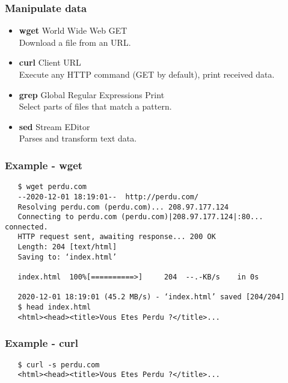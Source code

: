 \begin{frame}
   \frametitle{Manipulate data}
   \begin{itemize}
      \item {\bf wget} World Wide Web GET \\
            Download a file from an URL.
      \item {\bf curl} Client URL \\
            Execute any HTTP command (GET by default), print received data.
      \item {\bf grep} Global Regular Expressions Print \\
            Select parts of files that match a pattern.
      \item {\bf sed} Stream EDitor \\
            Parses and transform text data.
   \end{itemize}
\end{frame}

\begin{frame}[fragile]
   \frametitle{Example - wget}
   \begin{verbatim}
   $ wget perdu.com
   --2020-12-01 18:19:01--  http://perdu.com/
   Resolving perdu.com (perdu.com)... 208.97.177.124
   Connecting to perdu.com (perdu.com)|208.97.177.124|:80... connected.
   HTTP request sent, awaiting response... 200 OK
   Length: 204 [text/html]
   Saving to: ‘index.html’

   index.html  100%[==========>]     204  --.-KB/s    in 0s

   2020-12-01 18:19:01 (45.2 MB/s) - ‘index.html’ saved [204/204]
   $ head index.html
   <html><head><title>Vous Etes Perdu ?</title>...
   \end{verbatim}
\end{frame}



\begin{frame}[fragile]
   \frametitle{Example - curl}
   \begin{verbatim}
   $ curl -s perdu.com
   <html><head><title>Vous Etes Perdu ?</title>...
   \end{verbatim}
\end{frame}

